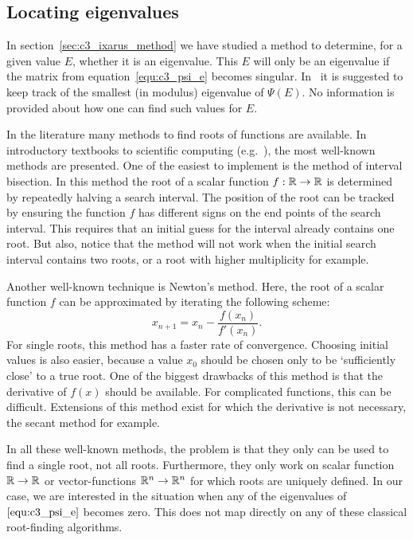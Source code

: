 \subsection{Locating eigenvalues}\label{sec:c3_locating_e}

In section~\ref{sec:c3_ixarus_method} we have studied a method to determine, for a given value $E$, whether it is an eigenvalue. This $E$ will only be an eigenvalue if the matrix from equation~\eqref{equ:c3_psi_e} becomes singular. In~\cite{ixaru_new_2010} it is suggested to keep track of the smallest (in modulus) eigenvalue of $\Psi(E)$. No information is provided about how one can find such values for $E$.

In the literature many methods to find roots of functions are available. In introductory textbooks to scientific computing (e.g.~\cite[Chapter~5]{heath_scientific_2002}), the most well-known methods are presented. One of the easiest to implement is the method of interval bisection. In this method the root of a scalar function $f : \mathbb{R} \to \mathbb{R}$ is determined by repeatedly halving a search interval. The position of the root can be tracked by ensuring the function $f$ has different signs on the end points of the search interval. This requires that an initial guess for the interval already contains one root. But also, notice that the method will not work when the initial search interval contains two roots, or a root with higher multiplicity for example.

Another well-known technique is Newton's method. Here, the root of a scalar function $f$ can be approximated by iterating the following scheme:
$$
  x_{n+1} = x_n - \frac{f(x_n)}{f'(x_n)}\text{.}
$$
For single roots, this method has a faster rate of convergence. Choosing initial values is also easier, because a value $x_0$ should be chosen only to be `sufficiently close' to a true root. One of the biggest drawbacks of this method is that the derivative of $f(x)$ should be available. For complicated functions, this can be difficult. Extensions of this method exist for which the derivative is not necessary, the secant method for example.

In all these well-known methods, the problem is that they only can be used to find a single root, not all roots. Furthermore, they only work on scalar function $\mathbb{R} \to \mathbb{R}$ or vector-functions $\mathbb{R}^n \to \mathbb{R}^n$ for which roots are uniquely defined. In our case, we are interested in the situation when any of the eigenvalues of $\eqref{equ:c3_psi_e}$ becomes zero. This does not map directly on any of these classical root-finding algorithms.

